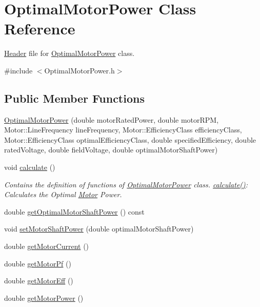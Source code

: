 \hypertarget{class_optimal_motor_power}{}\section{Optimal\+Motor\+Power Class Reference}
\label{class_optimal_motor_power}


\hyperlink{class_header}{Header} file for \hyperlink{class_optimal_motor_power}{Optimal\+Motor\+Power} class.  




{\ttfamily \#include $<$Optimal\+Motor\+Power.\+h$>$}

\subsection*{Public Member Functions}
\begin{DoxyCompactItemize}
\item 
\hyperlink{class_optimal_motor_power_a5fb4541ee91c6cdc2a5252f9ccce445d}{Optimal\+Motor\+Power} (double motor\+Rated\+Power, double motor\+R\+PM, Motor\+::\+Line\+Frequency line\+Frequency, Motor\+::\+Efficiency\+Class efficiency\+Class, Motor\+::\+Efficiency\+Class optimal\+Efficiency\+Class, double specified\+Efficiency, double rated\+Voltage, double field\+Voltage, double optimal\+Motor\+Shaft\+Power)
\item 
void \hyperlink{class_optimal_motor_power_ad4c02e2828d497a0b7f1c9198707f770}{calculate} ()
\begin{DoxyCompactList}\small\item\em Contains the definition of functions of \hyperlink{class_optimal_motor_power}{Optimal\+Motor\+Power} class. \hyperlink{class_optimal_motor_power_ad4c02e2828d497a0b7f1c9198707f770}{calculate()}\+: Calculates the Optimal \hyperlink{class_motor}{Motor} Power. \end{DoxyCompactList}\item 
double \hyperlink{class_optimal_motor_power_a7d6e976abf406c54637d3b51e098d7c8}{get\+Optimal\+Motor\+Shaft\+Power} () const
\item 
void \hyperlink{class_optimal_motor_power_ada8a9e3caac34c54470ad13ffe7edf53}{set\+Motor\+Shaft\+Power} (double optimal\+Motor\+Shaft\+Power)
\item 
double \hyperlink{class_optimal_motor_power_a2c058c4320a840018a420e10272cc4dd}{get\+Motor\+Current} ()
\item 
double \hyperlink{class_optimal_motor_power_a94d4c8a84c1bd19b799e35b966368f5a}{get\+Motor\+Pf} ()
\item 
double \hyperlink{class_optimal_motor_power_a341fe7520227f27f9cce23f3dc4cb0cb}{get\+Motor\+Eff} ()
\item 
double \hyperlink{class_optimal_motor_power_af35a32c24df9198bcf0df5b8f6ea03a9}{get\+Motor\+Power} ()
\end{DoxyCompactItemize}


